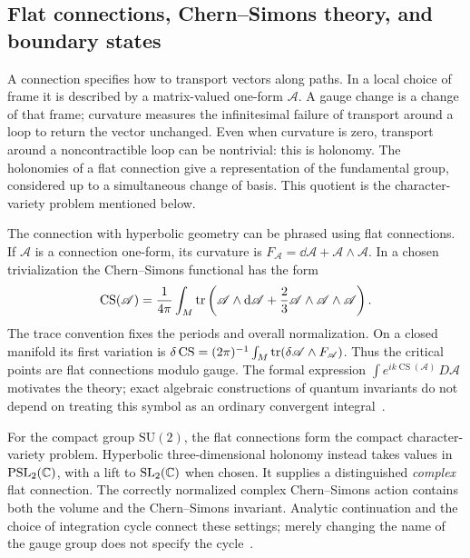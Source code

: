 \subsection{Flat connections, Chern--Simons theory, and boundary states}
\label{sec:introCS}

A connection specifies how to transport vectors along paths.
In a local choice of frame it is described by a matrix-valued
one-form $\mathscr A$. A gauge change is a change of that frame;
curvature measures the infinitesimal failure of transport around
a loop to return the vector unchanged. Even when curvature is
zero, transport around a noncontractible loop can be nontrivial:
this is holonomy. The holonomies of a flat connection give a
representation of the fundamental group, considered up to a
simultaneous change of basis. This quotient is the character-variety
problem mentioned below.

The connection with hyperbolic geometry can be phrased using flat
connections. If $\mathscr A$ is a connection one-form, its curvature
is $F_{\mathscr A}=\dd\mathscr A+\mathscr A\wedge\mathscr A$.
In a chosen trivialization the Chern--Simons functional has the form
\begin{equation}
 \operatorname{CS}(\mathscr A)=\frac1{4\pi}\int_M
   \operatorname{tr}\left(\mathscr A\wedge\mathop{}\!\mathrm d\mathscr A
                    +\frac23\mathscr A\wedge\mathscr A\wedge\mathscr A\right).
 \label{eq:introCSfunctional}
\end{equation}
The trace convention fixes the periods and overall normalization.
On a closed manifold its first variation is
$\delta\operatorname{CS}=(2\pi)^{-1}\int_M
\operatorname{tr}(\delta\mathscr A\wedge F_{\mathscr A})$.
Thus the critical points are flat connections modulo gauge.
The formal expression
$\int e^{ik\operatorname{CS}(\mathscr A)}\,D\mathscr A$
motivates the theory; exact algebraic constructions of quantum
invariants do not depend on treating this symbol as an ordinary
convergent integral~\cite{WittenJones}.

For the compact group $\mathrm{SU}(2)$, the flat connections form
the compact character-variety problem. Hyperbolic three-dimensional
holonomy instead takes values in $\mathrm{PSL}_2(\mathbb C)$, with a lift
to $\mathrm{SL}_2(\mathbb C)$ when chosen. It supplies a distinguished
\emph{complex} flat connection. The correctly normalized complex
Chern--Simons action contains both the volume and the Chern--Simons
invariant. Analytic continuation and the choice of integration
cycle connect these settings; merely changing the name of the
gauge group does not specify the cycle~\cite{GukovApoly,WittenContinuation}.

